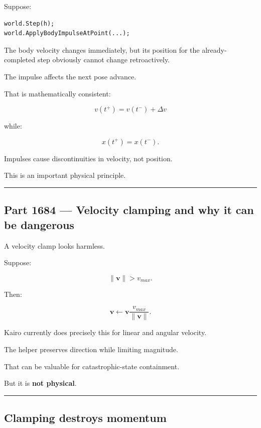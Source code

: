 Suppose:

\begin{verbatim}
world.Step(h);
world.ApplyBodyImpulseAtPoint(...);
\end{verbatim}

The body velocity changes immediately, but its position for the already-completed step obviously cannot change retroactively.

The impulse affects the next pose advance.

That is mathematically consistent:

\[
v(t^+)=v(t^-)+\Delta v
\]

while:

\[
x(t^+)=x(t^-).
\]

Impulses cause discontinuities in velocity, not position.

This is an important physical principle.

\begin{center}\rule{0.5\linewidth}{0.5pt}\end{center}

\subsection{Part 1684 --- Velocity clamping and why it can be dangerous}\label{06-engine-ii-ch038-part-1684-velocity-clamping-and-why-it-can-be-dangerous}

A velocity clamp looks harmless.

Suppose:

\[
\|\mathbf v\|>v_{max}.
\]

Then:

\[
\boxed{
\mathbf v
\leftarrow
\mathbf v
\frac{v_{max}}{\|\mathbf v\|}.
}
\]

Kairo currently does precisely this for linear and angular velocity.

The helper preserves direction while limiting magnitude.

That can be valuable for catastrophic-state containment.

But it is \textbf{not physical}.

\begin{center}\rule{0.5\linewidth}{0.5pt}\end{center}

\subsection{Clamping destroys momentum}\label{06-engine-ii-ch038-clamping-destroys-momentum}

